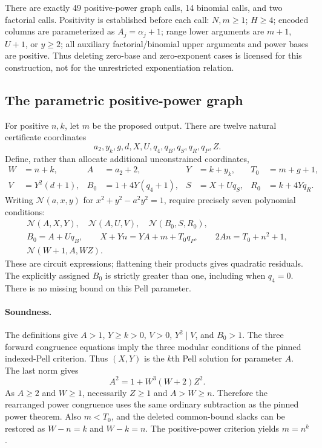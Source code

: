 \documentclass[11pt]{article}
\begin{document}
There are exactly 49 positive-power graph calls, 14 binomial calls, and
two factorial calls.  Positivity is established before each call:
$N,m\ge1$; $H\ge4$; encoded columns are parameterized as $A_j=\alpha_j+1$;
range lower arguments are $m+1$, $U+1$, or $y\ge2$; all auxiliary
factorial/binomial upper arguments and power bases are positive.
Thus deleting zero-base and zero-exponent cases is licensed for this
construction, not for the unrestricted exponentiation relation.

\subsection{The parametric positive-power graph}

For positive $n,k$, let $m$ be the proposed output.  There are twelve
natural certificate coordinates
\[
 a_2,y_k,g,d,X,U,q_4,q_B,q_S,q_R,q_P,Z.
\]
Define, rather than allocate additional unconstrained coordinates,
\begin{align*}
 W&=n+k,& A&=a_2+2,& Y&=k+y_k,& T_0&=m+g+1,\\
 V&=Y^2(d+1),& B_0&=1+4Y(q_4+1),&
 S&=X+Uq_S,& R_0&=k+4Yq_R.
\end{align*}
Writing $\mathcal N(a,x,y)$ for
$x^2+y^2-a^2y^2=1$, require precisely seven polynomial conditions:
\begin{gather*}
 \mathcal N(A,X,Y),\quad \mathcal N(A,U,V),\quad
 \mathcal N(B_0,S,R_0),\\
 B_0=A+Uq_B,\qquad
 X+Yn=YA+m+T_0q_P,\qquad 2An=T_0+n^2+1,\\
 \mathcal N(W+1,A,WZ). \tag{10}
\end{gather*}
These are circuit expressions; flattening their products gives quadratic
residuals.  The explicitly assigned $B_0$ is strictly greater than one,
including when $q_4=0$.  There is no missing bound on this Pell parameter.

\paragraph{Soundness.}
The definitions give $A>1$, $Y\ge k>0$, $V>0$, $Y^2\mid V$, and
$B_0>1$.  The three forward congruence equations imply the three modular
conditions of the pinned indexed-Pell criterion.  Thus $(X,Y)$ is the
$k$th Pell solution for parameter $A$.  The last norm gives
\[
 A^2=1+W^3(W+2)Z^2.
\]
As $A\ge2$ and $W\ge1$, necessarily $Z\ge1$ and $A>W\ge n$.
Therefore the rearranged power congruence uses the same ordinary
subtraction as the pinned power theorem.  Also $m<T_0$, and the deleted
common-bound slacks can be restored as $W-n=k$ and $W-k=n$.
The positive-power criterion yields $m=n^k$.
\end{document}
